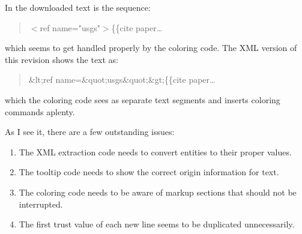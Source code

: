 In the downloaded text is the sequence:
\begin{quote}
$<$ref name="usgs"$>$\{\{cite paper\ldots
\end{quote}
which seems to get handled properly by the coloring code.
The XML version of this revision shows the text as:
\begin{quote}
\&lt;ref name=\&quot;usgs\&quot;\&gt;\{\{cite paper\ldots
\end{quote}
which the coloring code sees as separate text segments
and inserts coloring commands aplenty.


As I see it, there are a few outstanding issues:
\begin{enumerate}
\item The XML extraction code needs to convert entities to their
    proper values.
\item The tooltip code needs to show the correct origin information
    for text.
\item The coloring code needs to be aware of markup sections
    that should not be interrupted.
\item The first trust value of each new line seems to be
    duplicated unnecessarily.
\end{enumerate}

